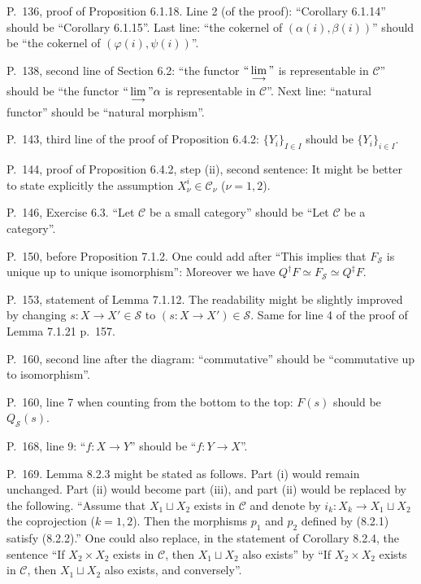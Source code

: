 \documentclass[12pt]{article}
\theoremstyle{remark}%
\newcommand{\n}{\noindent}
\newcommand{\C}{\mathcal C}
\newcommand{\SSS}{\mathcal S}
\newcommand{\U}{\mathcal U}
\newcommand{\p}{\varphi}
\DeclareMathOperator{\Hom}{Hom}
\begin{document}
\n P.~136, proof of Proposition 6.1.18. Line 2 (of the proof): ``Corollary 6.1.14'' should be ``Corollary 6.1.15''. Last line: ``the cokernel of $(\alpha(i),\beta(i))$'' should be ``the cokernel of $(\p(i),\psi(i))$''. 

\n P.~138, second line of Section 6.2: ``the functor $``\displaystyle\lim_{\longrightarrow}"$ is representable in $\C$'' should be ``the functor $``\displaystyle\lim_{\longrightarrow}"\alpha$ is representable in $\C$''. Next line: ``natural functor'' should be ``natural morphism''. 

\n P.~143, third line of the proof of Proposition 6.4.2: $\{Y_i\}_{I\in I}$ should be $\{Y_i\}_{i\in I}$. 

\n P.~144, proof of Proposition 6.4.2, step (ii), second sentence: It might be better to state explicitly the assumption $X_\nu^i\in\C_\nu$ ($\nu=1,2$). 

\n P.~146, Exercise 6.3. ``Let $\C$ be a small category'' should be ``Let $\C$ be a category''. 

\n P.~150, before Proposition 7.1.2. One could add after ``This implies that $F_{\SSS}$ is unique up to unique isomorphism'': Moreover we have $Q^\dagger F\simeq F_{\SSS}\simeq Q^\ddagger F$. 

\n P.~153, statement of Lemma 7.1.12. The readability might be slightly improved by changing $s:X\to X'\in\mathcal S$ to $(s:X\to X')\in\mathcal S$. Same for line 4 of the proof of Lemma 7.1.21 p.~157.  

\n P.~160, second line after the diagram: ``commutative'' should be ``commutative up to isomorphism''.

\n P.~160, line 7 when counting from the bottom to the top: $F(s)$ should be $Q_{\mathcal S}(s)$. 

\n P.~168, line 9: ``$f:X\to Y$'' should be ``$f:Y\to X$''. 


\n P.~169. Lemma 8.2.3 might be stated as follows. Part (i) would remain unchanged. Part (ii) would become part (iii), and part (ii) would be replaced by the following. ``Assume that $X_1\sqcup X_2$ exists in $\C$ and denote by $i_k:X_k\to X_1\sqcup X_2$ the coprojection ($k=1,2$). Then the morphisms $p_1$ and $p_2$ defined by (8.2.1) satisfy (8.2.2).'' One could also replace, in the statement of Corollary 8.2.4, the sentence ``If $X_2\times X_2$ exists in $\C$, then $X_1\sqcup X_2$ also exists'' by ``If $X_2\times X_2$ exists in $\C$, then $X_1\sqcup X_2$ also exists, and conversely''. 
\end{document}
